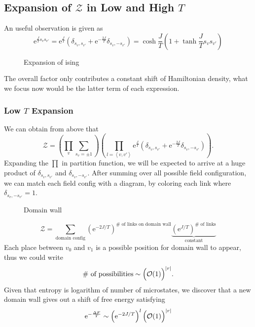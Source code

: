 \subsection{Expansion of $\mathcal{Z}$ in Low and High $T$}

An useful observation is given as
\begin{equation}
  \mathrm{e}^{\frac{J}{T} s_{v} s_{v'}} = \mathrm{e}^{\frac{J}{T}} \left( \delta_{s_v, s_{v'}} + \mathrm{e}^{-\frac{2J}{T}} \delta_{s_{v}, -s_{v'}} \right) = \cosh \frac{J}{T} \left( 1+ \tanh \frac{J}{T} s_{v} s_{v'} \right)
\end{equation}

\begin{figure}[ht]
    \centering
    \caption{Expansion of ising}
    \label{fig:expansion-of-ising}
\end{figure}

The overall factor only contributes a constant shift of Hamiltonian density, what we focus now would be the latter term of each expression.

\subsubsection{Low $T$ Expansion}
We can obtain from above that
\begin{equation}
  \mathcal{Z} = \left( \prod_{v} \sum_{s_{v} = \pm 1}  \right) \left( \prod_{l = \left< v,v' \right>}  \mathrm{e}^{\frac{J}{T}} \left( \delta_{s_v, s_{v'}} + \mathrm{e}^{-\frac{2J}{T}} \delta_{s_{v}, -s_{v'}} \right) \right).
\end{equation}
Expanding the $\displaystyle \prod $ in partition function, we will be expected to arrive at a huge product of $\delta_{s_v, s_{v'}}$ and $\delta_{s_v, - s_{v'}}$. After summing over all possible field configuration, we can match each field config with a diagram, by coloring each link where $\delta_{s_v, -s_{v'}} = 1$.

\begin{figure}[ht]
    \centering
    \caption{Domain wall}
    \label{fig:domain-wall}
\end{figure}

\begin{equation}
  \mathcal{Z} = \sum_{\text{domain config}} \left( \mathrm{e}^{- 2J /T}  \right)^{\# \text{ of links on domain wall}} \underbrace{\left( \mathrm{e}^{J / T} \right)^{\# \text{ of links}}}_{\text{constant}}
\end{equation}
Each place between $v_0$ and $v_1$ is a possible position for domain wall to appear, thus we could write
\begin{equation}
  \# \text{ of possibilities} \sim \Bigl( \mathcal{O} (1)  \Bigr)^{\left| r \right|}.
\end{equation}
Given that entropy is logarithm of number of microstates, we discover that a new domain wall gives out a shift of free energy satisfying
\begin{equation}
  \mathrm{e}^{- \frac{\Delta F}{T} } \sim \left( \mathrm{e}^{- 2J / T} \right)^{l} \Bigl( \mathcal{O} (1)  \Bigr)^{\left| r \right|}
\end{equation}

